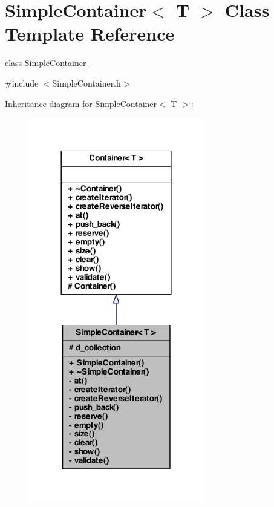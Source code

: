 \hypertarget{class_simple_container}{
\section{SimpleContainer$<$ T $>$ Class Template Reference}
\label{class_simple_container}
}


class \hyperlink{class_simple_container}{SimpleContainer} -\/  




{\ttfamily \#include $<$SimpleContainer.h$>$}



Inheritance diagram for SimpleContainer$<$ T $>$:
\nopagebreak
\begin{figure}[H]
\begin{center}
\leavevmode
\includegraphics[width=216pt]{class_simple_container__inherit__graph}
\end{center}
\end{figure}


